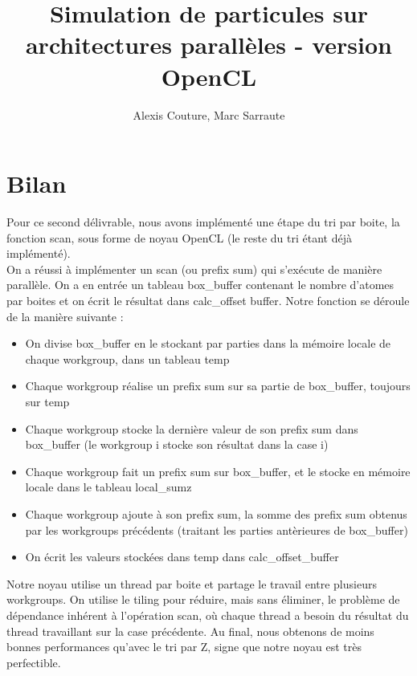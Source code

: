 \documentclass[]{article}
\title{Simulation de particules sur architectures parallèles - version OpenCL}
\author{Alexis Couture, Marc Sarraute}
\begin{document}
\maketitle

\section{Bilan}

Pour ce second délivrable, nous avons implémenté une étape du tri par boite, la fonction scan, sous forme de noyau OpenCL (le reste du tri étant déjà implémenté). \\

On a réussi à implémenter un scan (ou prefix sum) qui s'exécute de manière parallèle. On a en entrée un tableau box\_buffer contenant le nombre d'atomes par boites et on écrit le résultat dans calc\_offset buffer. Notre fonction se déroule de la manière suivante :
\\

\begin{itemize}
\item On divise box\_buffer en le stockant par parties dans la mémoire locale de chaque workgroup, dans un tableau temp
\item Chaque workgroup réalise un prefix sum sur sa partie de box\_buffer, toujours sur temp
\item Chaque workgroup stocke la dernière valeur de son prefix sum dans box\_buffer (le workgroup i stocke son résultat dans la case i)
\item Chaque workgroup fait un prefix sum sur box\_buffer, et le stocke en mémoire locale dans le tableau local\_sumz
\item Chaque workgroup ajoute à son prefix sum, la somme des prefix sum obtenus par les workgroups précédents (traitant les parties antèrieures de box\_buffer)
\item On écrit les valeurs stockées dans temp dans calc\_offset\_buffer\\
\end{itemize}

Notre noyau utilise un thread par boite et partage le travail entre plusieurs workgroups. On utilise le tiling pour réduire, mais sans éliminer, le problème de dépendance inhérent à l'opération scan, où chaque thread a besoin du résultat du thread travaillant sur la case précédente. 
Au final, nous obtenons de moins bonnes performances qu'avec le tri par Z, signe que notre noyau est très perfectible.\\
\end{document}
